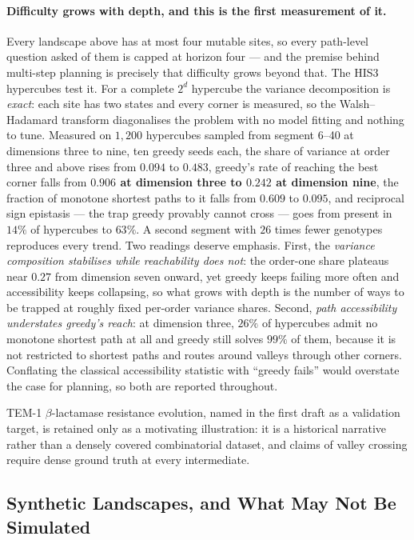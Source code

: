 \documentclass[12pt, a4paper]{article}
\begin{document}
\paragraph{Difficulty grows with depth, and this is the first measurement of it.} Every landscape above has at most four mutable sites, so every path-level question asked of them is capped at horizon four --- and the premise behind multi-step planning is precisely that difficulty grows beyond that. The HIS3 hypercubes test it. For a complete $2^d$ hypercube the variance decomposition is \textit{exact}: each site has two states and every corner is measured, so the Walsh--Hadamard transform diagonalises the problem with no model fitting and nothing to tune. Measured on $1{,}200$ hypercubes sampled from segment 6--40 at dimensions three to nine, ten greedy seeds each, the share of variance at order three and above rises from $0.094$ to $0.483$, greedy's rate of reaching the best corner falls from \textbf{$0.906$ at dimension three to $0.242$ at dimension nine}, the fraction of monotone shortest paths to it falls from $0.609$ to $0.095$, and reciprocal sign epistasis --- the trap greedy provably cannot cross --- goes from present in $14\%$ of hypercubes to $63\%$. A second segment with $26$ times fewer genotypes reproduces every trend. Two readings deserve emphasis. First, the \textit{variance composition stabilises while reachability does not}: the order-one share plateaus near $0.27$ from dimension seven onward, yet greedy keeps failing more often and accessibility keeps collapsing, so what grows with depth is the number of ways to be trapped at roughly fixed per-order variance shares. Second, \textit{path accessibility understates greedy's reach}: at dimension three, $26\%$ of hypercubes admit no monotone shortest path at all and greedy still solves $99\%$ of them, because it is not restricted to shortest paths and routes around valleys through other corners. Conflating the classical accessibility statistic with ``greedy fails'' would overstate the case for planning, so both are reported throughout.

TEM-1 $\beta$-lactamase resistance evolution, named in the first draft as a validation target, is retained only as a motivating illustration: it is a historical narrative rather than a densely covered combinatorial dataset, and claims of valley crossing require dense ground truth at every intermediate.

\subsection{Synthetic Landscapes, and What May Not Be Simulated}
\label{sec:synthetic}
\end{document}
